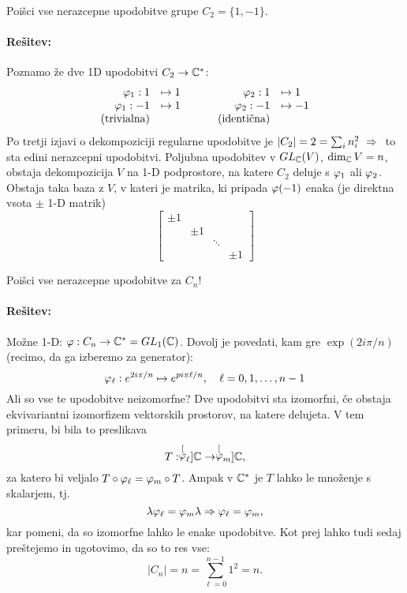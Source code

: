 \begin{zgled}
	Poi\v sci vse nerazcepne upodobitve grupe $C_2 = \{1, -1\}$. 
	
	\paragraph{Re\v sitev:} Poznamo \v ze dve 1D upodobitvi $C_2 \to \mathbb{C}^*$:
	\[
		\left.\begin{array}{rl}
			\vfi_1 : 1 &\mapsto 1 \\
			\vfi_1 :-1 &\mapsto 1 \\
			\text{(trivialna)}
		\end{array}\right. \qquad
		\left.\begin{array}{rl}
			\vfi_2 : 1 &\mapsto 1 \\
			\vfi_2 :-1 &\mapsto-1 \\
			\text{(identi\v cna)}
		\end{array}\right.
	\]
	Po tretji izjavi o dekompoziciji regularne upodobitve je $|C_2| = 2 = \sum_i n_i^2\ \Rightarrow\ $ to sta edini nerazcepni
	upodobitvi. Poljubna upodobitev v $GL_{\mathbb{C}}(V)$, $\dim_{\mathbb{C}} V = n$, obstaja dekompozicija $V$ na 1-D podprostore, na katere
	$C_2$ deluje s $\varphi_1$ ali $\varphi_2$. Obstaja taka baza z $V$, v kateri je matrika, ki pripada $\varphi(-1)$ enaka (je direktna
	vsota $\pm$ 1-D matrik)
	\[
		\begin{bmatrix}
			\pm 1 &       &        &      \\
			      & \pm 1 &        &      \\
			      &       & \ddots &      \\
			      &       &        & \pm 1
		\end{bmatrix}
	\]
\end{zgled}

\begin{zgled}
	Poi\v sci vse nerazcepne upodobitve za $C_n$!
	
	\paragraph{Re\v sitev:} Mo\v zne 1-D: $\varphi : C_n \to \mathbb{C}^* = GL_1(\mathbb{C})$. Dovolj je povedati, kam gre $\exp(2i\pi/n)$
	(recimo, da ga izberemo za generator):
	\[
		\varphi_\ell : e^{2i\pi/n} \mapsto e^{pi\pi\ell/n}, \quad \ell = 0, 1, \ldots, n-1
	\]
	Ali so vse te upodobitve neizomorfne? Dve upodobitvi sta izomorfni, \v ce obstaja ekvivariantni izomorfizem vektorskih
	prostorov, na katere delujeta. V tem primeru, bi bila to preslikava
	\[
		T : \stackrel[{\varphi}_\ell]{}{ \ensuremath{\mathbb{C}} } \to \stackrel[{\varphi}_m]{}{ \ensuremath{\mathbb{C}} },
	\]
	za katero bi veljalo $T \circ \varphi_\ell = \varphi_m \circ T$. Ampak v $\mathbb{C}^*$ je $T$ lahko le mno\v zenje s skalarjem, tj.
	\[
		\lambda \varphi_\ell = \varphi_m \lambda \Rightarrow \varphi_\ell = \varphi_m,
	\]
	kar pomeni, da so izomorfne lahko le enake upodobitve. Kot prej lahko tudi sedaj pre\v stejemo in ugotovimo, da so to res
	vse:
	\[
		|C_n| = n = \sum_{\ell = 0}^{n - 1} 1^2 = n.
	\]
\end{zgled}

